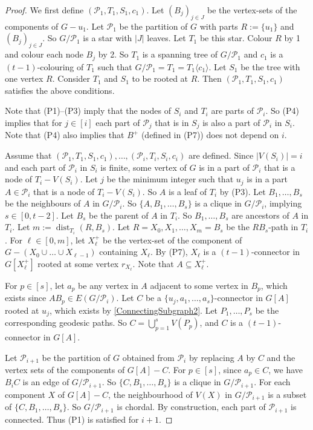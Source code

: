 \documentclass[a4paper,11pt]{article}
\theoremstyle{plain}
\theoremstyle{definition}
\DeclareMathOperator{\dist}{dist}
\newcommand{\PART}{\mathcal{P}}
\newcommand{\GGG}[2]{#1\langle{#2}\rangle}
\begin{document}
\begin{proof}
We first define $(\PART_1,T_1,S_1,c_1)$. Let $(B_j)_{j\in J}$ be the vertex-sets of the components of $G-u_1$. Let $\PART_1$ be the partition of $G$ with parts $R:=\{u_1\}$ and $(B_j)_{j\in J}$. So $G/\PART_1$ is a star with $|J|$ leaves. Let $T_1$ be this star. Colour $R$ by 1 and colour each node $B_j$ by 2. So $T_1$ is a spanning tree of $G/\PART_1$ and $c_1$ is a $(t-1)$-colouring of $T_1$ such that $G/\PART_1=T_1=\GGG{T_1}{c_1}$. Let $S_1$ be the tree with one vertex $R$. Consider $T_1$ and $S_1$ to be rooted at $R$. Then $(\PART_1,T_1,S_1,c_1)$ satisfies the above conditions. 

Note that (P1)--(P3) imply that the nodes of $S_i$ and $T_i$ are parts of $\PART_i$. So (P4) implies that for $j\in[i]$ each part of $\PART_j$ that is in $S_j$ is also a part of $\PART_i$ in $S_i$. Note that (P4) also implies that $B^+$ (defined in (P7)) does not depend on $i$.

Assume that $(\PART_1,T_1,S_1,c_1),\dots,(\PART_i,T_i,S_i,c_i)$ are defined. Since $|V(S_i)|=i$ and each part of $\PART_i$ in $S_i$ is finite, some vertex of $G$ is in a part of $\PART_i$ that is a node of $T_i-V(S_i)$. Let $j$ be the minimum integer such that $u_j$ is in a part $A\in \PART_i$ that is a node of $T_i-V(S_i)$. So $A$ is a leaf of $T_i$ by (P3). Let $B_1,\dots,B_s$ be the neighbours of $A$ in $G/\PART_i$. So $\{A,B_1,\dots,B_s\}$ is a clique in $G/\PART_i$, implying  $s\in[0,t-2]$. 
Let $B_s$ be the parent of $A$ in $T_i$. So $B_1,\dots,B_s$ are ancestors of $A$ in $T_i$. Let $m:=\dist_{T_i}(R,B_s)$. Let $R=X_0,X_1,\dots,X_m=B_s$ be the $RB_s$-path in $T_i$. For $\ell\in[0,m]$, let $X^+_\ell$ be the vertex-set of the component of $G-(X_0\cup\dots\cup X_{\ell-1})$ containing $X_\ell$. By (P7), $X_\ell$ is a $(t-1)$-connector in $G[X^+_\ell]$ rooted at some vertex $r_{X_\ell}$. Note that $A\subseteq X^+_\ell$. 

For $p\in[s]$, let $a_p$ be any vertex in $A$ adjacent to some vertex in $B_p$, which exists since $AB_p\in E(G/\PART_i)$. Let $C$ be a $\{u_j,a_1,\dots,a_s\}$-connector in $G[A]$ rooted at $u_j$, which exists by \cref{ConnectingSubgraph2}. Let $P_1,\dots,P_s$ be the corresponding geodesic paths. So $C=\bigcup_{p=1}^s V(P_p)$, and $C$ is a $(t-1)$-connector in $G[A]$. 

Let $\PART_{i+1}$ be the partition of $G$ obtained from $\PART_i$ by replacing $A$ by $C$ and the vertex sets of the components of $G[A]-C$. For $p\in[s]$, since $a_p\in C$, we have $B_iC$ is an edge of $G/\PART_{i+1}$. 
So $\{C,B_1,\dots,B_s\}$ is a clique in $G/\PART_{i+1}$. For each component $X$ of $G[A]-C$, the neighbourhood of $V(X)$ in $G/\PART_{i+1}$ is a subset of $\{C,B_1,\dots,B_s\}$. 
So $G/\PART_{i+1}$ is chordal. By construction, each part of $\PART_{i+1}$ is connected. Thus (P1) is satisfied for $i+1$. 


\end{proof}
\end{document}
